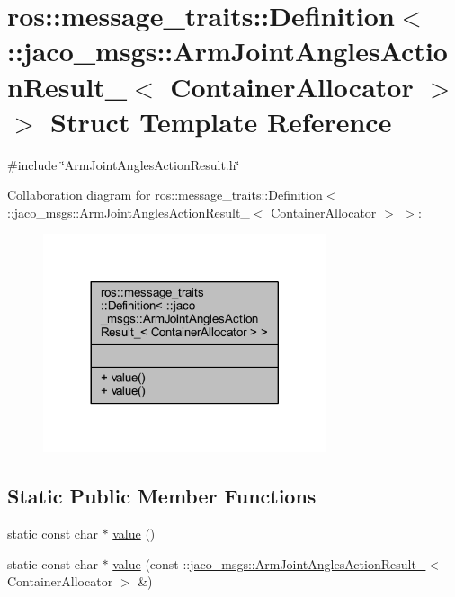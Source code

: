 \hypertarget{structros_1_1message__traits_1_1Definition_3_01_1_1jaco__msgs_1_1ArmJointAnglesActionResult___3_01ContainerAllocator_01_4_01_4}{}\section{ros\+:\+:message\+\_\+traits\+:\+:Definition$<$ \+:\+:jaco\+\_\+msgs\+:\+:Arm\+Joint\+Angles\+Action\+Result\+\_\+$<$ Container\+Allocator $>$ $>$ Struct Template Reference}
\label{structros_1_1message__traits_1_1Definition_3_01_1_1jaco__msgs_1_1ArmJointAnglesActionResult___3_01ContainerAllocator_01_4_01_4}


{\ttfamily \#include \char`\"{}Arm\+Joint\+Angles\+Action\+Result.\+h\char`\"{}}



Collaboration diagram for ros\+:\+:message\+\_\+traits\+:\+:Definition$<$ \+:\+:jaco\+\_\+msgs\+:\+:Arm\+Joint\+Angles\+Action\+Result\+\_\+$<$ Container\+Allocator $>$ $>$\+:
\nopagebreak
\begin{figure}[H]
\begin{center}
\leavevmode
\includegraphics[width=236pt]{dc/d5f/structros_1_1message__traits_1_1Definition_3_01_1_1jaco__msgs_1_1ArmJointAnglesActionResult___3_cc621292d720c4aa351cfbf48b3f8980}
\end{center}
\end{figure}
\subsection*{Static Public Member Functions}
\begin{DoxyCompactItemize}
\item 
static const char $\ast$ \hyperlink{structros_1_1message__traits_1_1Definition_3_01_1_1jaco__msgs_1_1ArmJointAnglesActionResult___3_01ContainerAllocator_01_4_01_4_ad14ba6c49584f615bca38e6428704c09}{value} ()
\item 
static const char $\ast$ \hyperlink{structros_1_1message__traits_1_1Definition_3_01_1_1jaco__msgs_1_1ArmJointAnglesActionResult___3_01ContainerAllocator_01_4_01_4_af2afa0383f3d1b1fc62f941d1c630b23}{value} (const \+::\hyperlink{structjaco__msgs_1_1ArmJointAnglesActionResult__}{jaco\+\_\+msgs\+::\+Arm\+Joint\+Angles\+Action\+Result\+\_\+}$<$ Container\+Allocator $>$ \&)
\end{DoxyCompactItemize}


